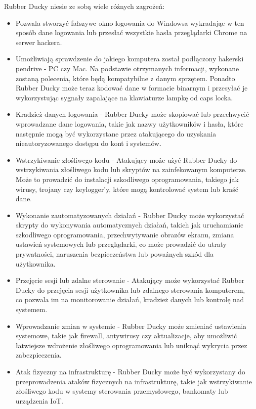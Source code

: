 \documentclass{article}
\begin{document}
Rubber Ducky niesie ze sobą wiele różnych zagrożeń:
\begin{itemize}
    \item Pozwala stworzyć fałszywe okno logowania do Windowsa wykradając w ten sposób dane logowania lub przesłać wszystkie hasła przeglądarki Chrome na serwer hackera. 
    \item Umożliwiają sprawdzenie do jakiego komputera został podłączony hakerski pendrive - PC czy Mac. Na podstawie otrzymanych informacji, wykonane zostaną polecenia, które będą kompatybilne z danym sprzętem. Ponadto Rubber Ducky może teraz kodować dane w formacie binarnym i przesyłać je wykorzystując sygnały zapalające na klawiaturze lampkę od caps locka.
    \item Kradzież danych logowania - Rubber Ducky może skopiować lub przechwycić wprowadzane dane logowania, takie jak nazwy użytkowników i hasła, które następnie mogą być wykorzystane przez atakującego do uzyskania nieautoryzowanego dostępu do kont i systemów.
    \item Wstrzykiwanie złośliwego kodu - Atakujący może użyć Rubber Ducky do wstrzykiwania złośliwego kodu lub skryptów na zainfekowanym komputerze. Może to prowadzić do instalacji szkodliwego oprogramowania, takiego jak wirusy, trojany czy keylogger'y, które mogą kontrolować system lub kraść dane.
    \item Wykonanie zautomatyzowanych działań - Rubber Ducky może wykorzystać skrypty do wykonywania automatycznych działań, takich jak uruchamianie szkodliwego oprogramowania, przechwytywanie obrazów ekranu, zmiana ustawień systemowych lub przeglądarki, co może prowadzić do utraty prywatności, naruszenia bezpieczeństwa lub poważnych szkód dla użytkownika.
    \item  Przejęcie sesji lub zdalne sterowanie - Atakujący może wykorzystać Rubber Ducky do przejęcia sesji użytkownika lub zdalnego sterowania komputerem, co pozwala im na monitorowanie działań, kradzież danych lub kontrolę nad systemem.
    \item Wprowadzanie zmian w systemie - Rubber Ducky może zmieniać ustawienia systemowe, takie jak firewall, antywirusy czy aktualizacje, aby umożliwić łatwiejsze wdrożenie złośliwego oprogramowania lub uniknąć wykrycia przez zabezpieczenia.
    \item  Atak fizyczny na infrastrukturę - Rubber Ducky może być wykorzystany do przeprowadzenia ataków fizycznych na infrastrukturę, takie jak wstrzykiwanie złośliwego kodu w systemy sterowania przemysłowego, bankomaty lub urządzenia IoT.

    
\end{itemize} 
\end{document}
